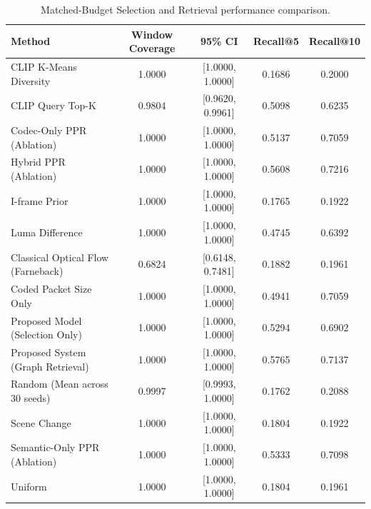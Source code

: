 \begin{table}[h]
\centering
\begin{tabular}{lcccc}
\hline
Method & Window Coverage & 95\% CI & Recall@5 & Recall@10 \\
\hline
CLIP K-Means Diversity & 1.0000 & [1.0000, 1.0000] & 0.1686 & 0.2000 \\
CLIP Query Top-K & 0.9804 & [0.9620, 0.9961] & 0.5098 & 0.6235 \\
Codec-Only PPR (Ablation) & 1.0000 & [1.0000, 1.0000] & 0.5137 & 0.7059 \\
Hybrid PPR (Ablation) & 1.0000 & [1.0000, 1.0000] & 0.5608 & 0.7216 \\
I-frame Prior & 1.0000 & [1.0000, 1.0000] & 0.1765 & 0.1922 \\
Luma Difference & 1.0000 & [1.0000, 1.0000] & 0.4745 & 0.6392 \\
Classical Optical Flow (Farneback) & 0.6824 & [0.6148, 0.7481] & 0.1882 & 0.1961 \\
Coded Packet Size Only & 1.0000 & [1.0000, 1.0000] & 0.4941 & 0.7059 \\
Proposed Model (Selection Only) & 1.0000 & [1.0000, 1.0000] & 0.5294 & 0.6902 \\
Proposed System (Graph Retrieval) & 1.0000 & [1.0000, 1.0000] & 0.5765 & 0.7137 \\
Random (Mean across 30 seeds) & 0.9997 & [0.9993, 1.0000] & 0.1762 & 0.2088 \\
Scene Change & 1.0000 & [1.0000, 1.0000] & 0.1804 & 0.1922 \\
Semantic-Only PPR (Ablation) & 1.0000 & [1.0000, 1.0000] & 0.5333 & 0.7098 \\
Uniform & 1.0000 & [1.0000, 1.0000] & 0.1804 & 0.1961 \\
\hline
\end{tabular}
\caption{Matched-Budget Selection and Retrieval performance comparison.}
\label{tab:primary_results}
\end{table}
